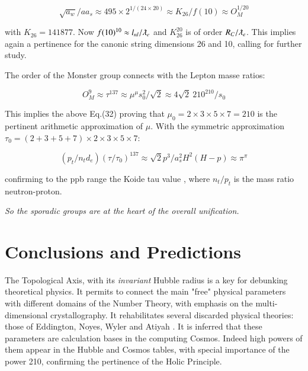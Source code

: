 \documentclass[a4paper,9pt]{article}
\begin{document}
\begin{equation}\label{Eq52}
 \sqrt {a_w}/aa_s \approx 495 \times 2^{1/(24\times20)} \approx K_{26}/f(10) \approx O_M^{1/20}    
 \end{equation}

 with $K_{26} = 141877$. Now $f(10)^{10} \approx l_{nl}/\lambdabar_e$ and $K_{26}^{20}$ is of order $R_C/\lambdabar_e$. This implies again a pertinence for the canonic string dimensions 26 and 10, calling for further study.
 
 The order of the Monster group connects with the Lepton masse ratios:
 
 \begin{equation}\label{Eq53}
 O_M^9 \approx \tau^{137} \approx \mu^\mu s_0^2/\sqrt2 \approx 4 \sqrt2 ~210^{210}/s_0     
 \end{equation}
 
This implies the above Eq.(32) proving that $\mu_0 = 2\times 3\times 5\times 7 = 210$ is the pertinent arithmetic approximation of $\mu$. With the symmetric approximation $\tau_0 = (2+3+5+7) \times 2\times 3\times 5\times 7 $: 
 
\begin{equation}\label{Eq54}
 (p_t/n_td_e)(\tau/\tau_0 )^{137} \approx \sqrt2 p^3/a_s^2H^2(H-p) \approx \pi^{\pi}  
 \end{equation}

confirming to the ppb range the Koide tau value \cite{Koide}, where $n_t/p_t$ is the mass ratio neutron-proton.

\textit{So the sporadic groups are at the heart of the overall unification.}
 
 
  
 
\section{Conclusions and Predictions}

The Topological Axis, with its \textit{invariant} Hubble radius is a key for debunking theoretical physics. It permits to connect the main "free" physical parameters with different domains of the Number Theory, with emphasis on the  multi-dimensional crystallography. It rehabilitates several discarded physical theories: those of Eddington\cite{Eddington}, Noyes\cite{Noyes}, Wyler\cite{Wyler} and Atiyah \cite{Atiyah}. It is inferred that these parameters are calculation bases in the computing Cosmos. Indeed high powers of them appear in the Hubble and Cosmos tables, with special importance of the power 210, confirming the pertinence of the Holic Principle.
\end{document}

